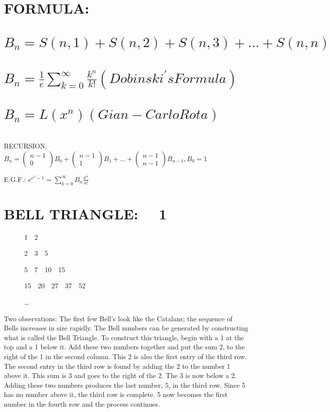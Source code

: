 \documentclass{article}
\begin{document}
\section[FORMULA: \ \ ]{FORMULA: \ \ }
\section[\ ]{  $B_n=S\left(n,1\right)+S\left(n,2\right)+S\left(n,3\right)+{\dots}+S(n,n)$}
\section[ ]{ $B_n=\frac 1 e\sum _{k=0}^{{\infty}}\frac{k^n}{k!}(\mathit{Dobinsk}i^'s\mathit{Formula})$ }
\section[ ]{ $B_n=L\left(x^n\right)(\mathit{Gian}-\mathit{Carlo}\mathit{Rota})$ }
\section{}
RECURSION: 
$B_n=\left(\begin{matrix}n-1\\0\end{matrix}\right)B_0+\left(\begin{matrix}n-1\\1\end{matrix}\right)B_1+{\dots}+\left(\begin{matrix}n-1\\n-1\end{matrix}\right)B_{n-1},B_0=1$

E.G.F.:   $e^{e^x-1}=\sum _{k=0}^{{\infty}}B_n\frac{x^n}{n!}$

\section[BELL TRIANGLE: \ \ 1]{BELL TRIANGLE: \ \ 1}
\ \ \ \ \ \ 1\ \ 2

\ \ \ \ \ \ 2\ \ 3\ \ 5

\ \ \ \ \ \ 5\ \ 7\ \ 10\ \ 15

\ \ \ \ \ \ 15\ \ 20\ \ 27\ \ 37\ \ 52

\ \ \ \ \ \ …

Two observations: The first few Bell’s look like the Catalans; the sequence of Bells increases in size rapidly. The Bell
numbers can be generated by constructing what is called the Bell Triangle. To construct this triangle, begin with a 1
at the top and a 1 below it. Add these two numbers together and put the sum 2, to the right of the 1 in the second
column. This 2 is also the first entry of the third row. The second entry in the third row is found by adding the 2 to
the number 1 above it. This sum is 3 and goes to the right of the 2. The 3 is now below a 2. Adding these two numbers
produces the last number, 5, in the third row. Since 5 has no number above it, the third row is complete. 5 now becomes
the first number in the fourth row and the process continues. 
\end{document}
